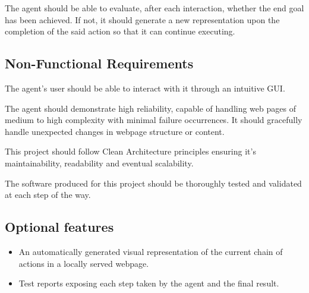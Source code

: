 \documentclass{article}
\begin{document}
		The agent should be able to evaluate, after each interaction, whether the end goal has been achieved. If not, it should generate a new representation upon the completion of the said action so that it can continue executing. 
	\subsection{Non-Functional Requirements}
		The agent's user should be able to interact with it through an intuitive GUI.
        
		The agent should demonstrate high reliability, capable of handling web pages of medium to high complexity with minimal failure occurrences. It should gracefully handle unexpected changes in webpage structure or content.
        
		This project should follow Clean Architecture principles ensuring it's maintainability, readability and eventual scalability.
        
		The software produced for this project should be thoroughly tested and validated at each step of the way.
	\subsection{Optional features}
	\begin{itemize}
		\item An automatically generated visual representation of the current chain of actions in a locally served webpage.
		\item Test reports exposing each step taken by the agent and the final result.
	\end{itemize}
	
	\pagebreak
	
\end{document}

